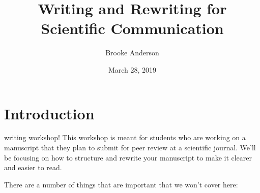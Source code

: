 \documentclass[]{tufte-book}
\title{Writing and Rewriting for Scientific Communication}
\author{Brooke Anderson}
\date{March 28, 2019}
\begin{document}
\maketitle



{
\setcounter{tocdepth}{1}
\tableofcontents
}

\hypertarget{introduction}{%
\chapter{Introduction}\label{introduction}}

 writing workshop! This workshop is
meant for students who are working on a manuscript that they plan to submit for
peer review at a scientific journal. We'll be focusing on how to structure and
rewrite your manuscript to make it clearer and easier to read.

There are a number of things that are important that we won't cover here:
\end{document}
